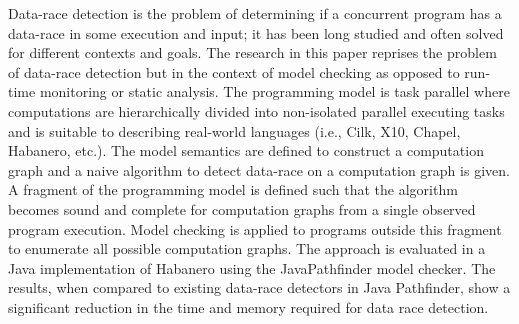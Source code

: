 Data-race detection is the problem of determining if a concurrent program has a data-race in some execution and input; it has been long studied and often solved for different contexts and goals. The research in this paper reprises the problem of data-race detection but in the context of model checking as opposed to run-time monitoring or static analysis. The programming model is task parallel where computations are hierarchically divided into non-isolated parallel executing tasks and is suitable to describing real-world languages (i.e., Cilk, X10, Chapel, Habanero, etc.). The model semantics are defined to construct a computation graph and a naive algorithm to detect data-race on a computation graph is given. A fragment of the programming model is defined such that the algorithm becomes sound and complete for computation graphs from a single observed program execution. Model checking is applied to programs outside this fragment to enumerate all possible computation graphs. The approach is evaluated in a Java implementation of Habanero using the JavaPathfinder model checker. The results, when compared to existing data-race detectors in Java Pathfinder, show a significant reduction in the time and memory required for data race detection.


